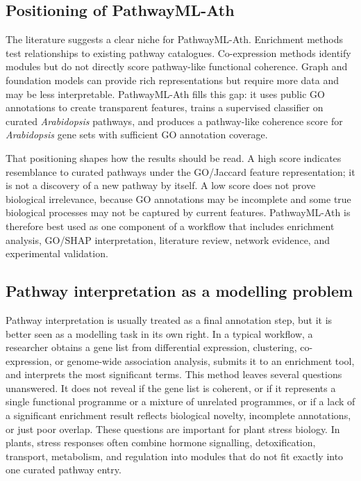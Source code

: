 \documentclass[12pt,twoside]{article}
\begin{document}
\subsection{Positioning of PathwayML-Ath}
\label{sec:lit_positioning}

The literature suggests a clear niche for PathwayML-Ath. Enrichment methods test relationships to existing pathway catalogues. Co-expression methods identify modules but do not directly score pathway-like functional coherence. Graph and foundation models can provide rich representations but require more data and may be less interpretable. PathwayML-Ath fills this gap: it uses public GO annotations to create transparent features, trains a supervised classifier on curated \textit{Arabidopsis} pathways, and produces a pathway-like coherence score for \textit{Arabidopsis} gene sets with sufficient GO annotation coverage.

That positioning shapes how the results should be read. A high score indicates resemblance to curated pathways under the GO/Jaccard feature representation; it is not a discovery of a new pathway by itself. A low score does not prove biological irrelevance, because GO annotations may be incomplete and some true biological processes may not be captured by current features. PathwayML-Ath is therefore best used as one component of a workflow that includes enrichment analysis, GO/SHAP interpretation, literature review, network evidence, and experimental validation.




\subsection{Pathway interpretation as a modelling problem}
\label{sec:bg_why_thesis}

Pathway interpretation is usually treated as a final annotation step, but it is better seen as a modelling task in its own right. In a typical workflow, a researcher obtains a gene list from differential expression, clustering, co-expression, or genome-wide association analysis, submits it to an enrichment tool, and interprets the most significant terms. This method leaves several questions unanswered. It does not reveal if the gene list is coherent, or if it represents a single functional programme or a mixture of unrelated programmes, or if a lack of a significant enrichment result reflects biological novelty, incomplete annotations, or just poor overlap. These questions are important for plant stress biology. In plants, stress responses often combine hormone signalling, detoxification, transport, metabolism, and regulation into modules that do not fit exactly into one curated pathway entry.
\end{document}
